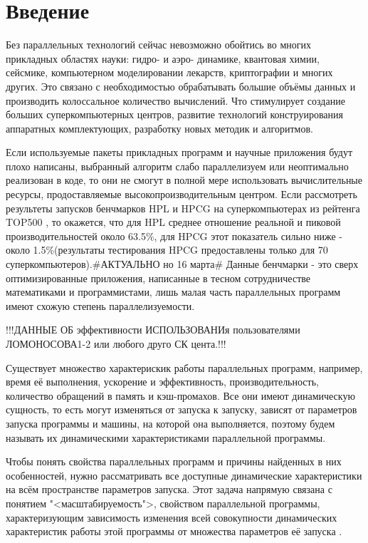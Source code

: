 \chapter{Введение}
	Без параллельных технологий сейчас невозможно обойтись во многих прикладных областях науки: гидро- и аэро- динамике, квантовая химии, сейсмике, компьютерном моделировании лекарств, криптографии и многих других. Это связано с необходимостью обрабатывать большие объёмы данных и производить колоссальное количество вычислений. Что стимулирует создание больших суперкомпьютерных центров, развитие технологий конструирования аппаратных комплектующих, разработку новых методик и алгоритмов.

	Если используемые пакеты прикладных программ и научные приложения будут плохо написаны, выбранный алгоритм слабо параллелизуем или неоптимально реализован в коде, то они не смогут в полной мере использовать вычислительные ресурсы, продоставляемые высокопроизводительным центром. Если рассмотреть результеты запусков бенчмарков HPL и HPCG на суперкомпьютерах из рейтенга TOP500 \cite{top500}, то окажется, что для HPL среднее отношение реальной и пиковой производительностей около 63.5\%, для HPCG этот показатель сильно ниже - около 1.5\%(результаты тестирования HPCG предоставлены только для 70 суперкомпьютеров).\#АКТУАЛЬНО но 16 марта\# Данные бенчмарки - это сверх оптимизированные приложения, написанные в тесном сотрудничестве математиками и программистами, лишь малая часть параллельных программ имеют схожую степень параллелизуемости.

	!!!ДАННЫЕ ОБ эффективности ИСПОЛЬЗОВАНИя пользователями ЛОМОНОСОВА1-2 или любого друго СК цента.!!!



	Существует множество характерискик работы параллельных программ, например, время её выполнения, ускорение и эффективность, производительность, количество обращений в память и кэш-промахов. Все они имеют динамическую сущность, то есть могут изменяться от запуска к запуску, зависят от параметров запуска программы и машины, на которой она выполняется, поэтому будем называть их динамическими характеристиками параллельной программы.

	Чтобы понять свойства параллельных программ и причины найденных в них особенностей, нужно рассматривать все доступные динамические характеристики на всём пространстве параметров запуска. Этот задача напрямую связана с понятием "<масштабируемость">, свойством параллельной программы, характеризующим зависимость изменения всей совокупности динамических характеристик работы этой программы от множества параметров её запуска \cite{scalability_def}.

